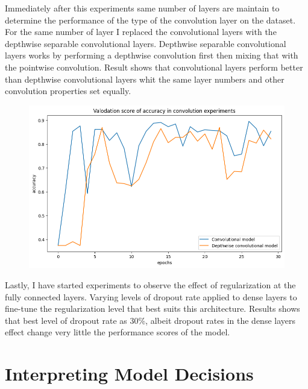 Immediately after this experiments same number of layers are maintain to determine the performance of the type of the convolution layer on the dataset.
For the same number of layer I replaced the convolutional layers with the depthwise separable convolutional layers.
Depthwise separable convolutional layers works by performing a depthwise convolution first then mixing that with the pointwise convolution.
Result shows that convolutional layers perform better than depthwise convolutional layers whit the same layer numbers and other convolution properties set equally.

\begin{figure}[H]
    \centering
    \includegraphics[width=.8\textwidth]{img/deptoconvexpaccuracy.png}
    \caption{}
    \label{fig:depttoconvacc}
\end{figure}

Lastly, I have started experiments to observe the effect of regularization at the fully connected layers.
Varying levels of dropout rate applied to dense layers to fine-tune the regularization level that best suits this architecture. Results shows that best level of dropout rate as 30\%, albeit dropout rates in the dense layers effect change very little the performance scores of the model.

\section{Interpreting Model Decisions}

